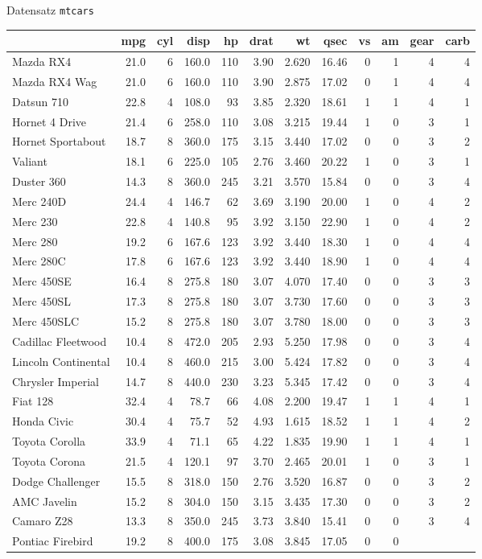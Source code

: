 \documentclass[ignorenonframetext,]{beamer}
\begin{document}
\begin{frame}{Datensatz \texttt{mtcars}}
\protect\hypertarget{datensatz-mtcars}{}

\begin{longtable}[]{@{}lrrrrrrrrrrr@{}}
\toprule
& mpg & cyl & disp & hp & drat & wt & qsec & vs & am & gear &
carb\tabularnewline
\midrule
\endhead
Mazda RX4 & 21.0 & 6 & 160.0 & 110 & 3.90 & 2.620 & 16.46 & 0 & 1 & 4 &
4\tabularnewline
Mazda RX4 Wag & 21.0 & 6 & 160.0 & 110 & 3.90 & 2.875 & 17.02 & 0 & 1 &
4 & 4\tabularnewline
Datsun 710 & 22.8 & 4 & 108.0 & 93 & 3.85 & 2.320 & 18.61 & 1 & 1 & 4 &
1\tabularnewline
Hornet 4 Drive & 21.4 & 6 & 258.0 & 110 & 3.08 & 3.215 & 19.44 & 1 & 0 &
3 & 1\tabularnewline
Hornet Sportabout & 18.7 & 8 & 360.0 & 175 & 3.15 & 3.440 & 17.02 & 0 &
0 & 3 & 2\tabularnewline
Valiant & 18.1 & 6 & 225.0 & 105 & 2.76 & 3.460 & 20.22 & 1 & 0 & 3 &
1\tabularnewline
Duster 360 & 14.3 & 8 & 360.0 & 245 & 3.21 & 3.570 & 15.84 & 0 & 0 & 3 &
4\tabularnewline
Merc 240D & 24.4 & 4 & 146.7 & 62 & 3.69 & 3.190 & 20.00 & 1 & 0 & 4 &
2\tabularnewline
Merc 230 & 22.8 & 4 & 140.8 & 95 & 3.92 & 3.150 & 22.90 & 1 & 0 & 4 &
2\tabularnewline
Merc 280 & 19.2 & 6 & 167.6 & 123 & 3.92 & 3.440 & 18.30 & 1 & 0 & 4 &
4\tabularnewline
Merc 280C & 17.8 & 6 & 167.6 & 123 & 3.92 & 3.440 & 18.90 & 1 & 0 & 4 &
4\tabularnewline
Merc 450SE & 16.4 & 8 & 275.8 & 180 & 3.07 & 4.070 & 17.40 & 0 & 0 & 3 &
3\tabularnewline
Merc 450SL & 17.3 & 8 & 275.8 & 180 & 3.07 & 3.730 & 17.60 & 0 & 0 & 3 &
3\tabularnewline
Merc 450SLC & 15.2 & 8 & 275.8 & 180 & 3.07 & 3.780 & 18.00 & 0 & 0 & 3
& 3\tabularnewline
Cadillac Fleetwood & 10.4 & 8 & 472.0 & 205 & 2.93 & 5.250 & 17.98 & 0 &
0 & 3 & 4\tabularnewline
Lincoln Continental & 10.4 & 8 & 460.0 & 215 & 3.00 & 5.424 & 17.82 & 0
& 0 & 3 & 4\tabularnewline
Chrysler Imperial & 14.7 & 8 & 440.0 & 230 & 3.23 & 5.345 & 17.42 & 0 &
0 & 3 & 4\tabularnewline
Fiat 128 & 32.4 & 4 & 78.7 & 66 & 4.08 & 2.200 & 19.47 & 1 & 1 & 4 &
1\tabularnewline
Honda Civic & 30.4 & 4 & 75.7 & 52 & 4.93 & 1.615 & 18.52 & 1 & 1 & 4 &
2\tabularnewline
Toyota Corolla & 33.9 & 4 & 71.1 & 65 & 4.22 & 1.835 & 19.90 & 1 & 1 & 4
& 1\tabularnewline
Toyota Corona & 21.5 & 4 & 120.1 & 97 & 3.70 & 2.465 & 20.01 & 1 & 0 & 3
& 1\tabularnewline
Dodge Challenger & 15.5 & 8 & 318.0 & 150 & 2.76 & 3.520 & 16.87 & 0 & 0
& 3 & 2\tabularnewline
AMC Javelin & 15.2 & 8 & 304.0 & 150 & 3.15 & 3.435 & 17.30 & 0 & 0 & 3
& 2\tabularnewline
Camaro Z28 & 13.3 & 8 & 350.0 & 245 & 3.73 & 3.840 & 15.41 & 0 & 0 & 3 &
4\tabularnewline
Pontiac Firebird & 19.2 & 8 & 400.0 & 175 & 3.08 & 3.845 & 17.05 & 0 & 0

\end{longtable}
\end{frame}
\end{document}
